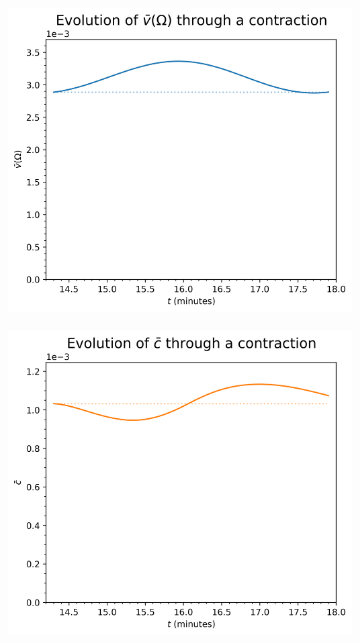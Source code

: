             \begin{figure}
                \centering
                \begin{subfigure}{0.45\textwidth}
                    \includegraphics[width=\textwidth]{diagrams/results-contractions/mm-quantities-velocity.png}
                    \caption{}
                    \label{fig:mm-quantities:velocity}
                \end{subfigure}
                \begin{subfigure}{0.45\textwidth}
                    \includegraphics[width=\textwidth]{diagrams/results-contractions/mm-quantities-uptake.png}

\end{subfigure}
\end{figure}
